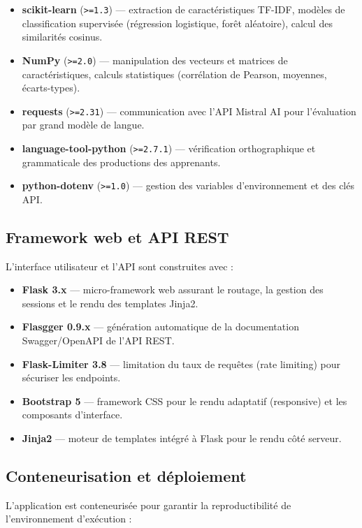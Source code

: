 \begin{itemize}
    \item \textbf{scikit-learn} (\texttt{>=1.3}) — extraction de caractéristiques TF-IDF, modèles de classification supervisée (régression logistique, forêt aléatoire), calcul des similarités cosinus.
    \item \textbf{NumPy} (\texttt{>=2.0}) — manipulation des vecteurs et matrices de caractéristiques, calculs statistiques (corrélation de Pearson, moyennes, écarts-types).
    \item \textbf{requests} (\texttt{>=2.31}) — communication avec l'API Mistral AI pour l'évaluation par grand modèle de langue.
    \item \textbf{language-tool-python} (\texttt{>=2.7.1}) — vérification orthographique et grammaticale des productions des apprenants.
    \item \textbf{python-dotenv} (\texttt{>=1.0}) — gestion des variables d'environnement et des clés API.
\end{itemize}

\subsection{Framework web et API REST}

L'interface utilisateur et l'API sont construites avec :

\begin{itemize}
    \item \textbf{Flask 3.x} — micro-framework web assurant le routage, la gestion des sessions et le rendu des templates Jinja2.
    \item \textbf{Flasgger 0.9.x} — génération automatique de la documentation Swagger/OpenAPI de l'API REST.
    \item \textbf{Flask-Limiter 3.8} — limitation du taux de requêtes (rate limiting) pour sécuriser les endpoints.
    \item \textbf{Bootstrap 5} — framework CSS pour le rendu adaptatif (responsive) et les composants d'interface.
    \item \textbf{Jinja2} — moteur de templates intégré à Flask pour le rendu côté serveur.
\end{itemize}

\subsection{Conteneurisation et déploiement}

L'application est conteneurisée pour garantir la reproductibilité de l'environnement d'exécution :

